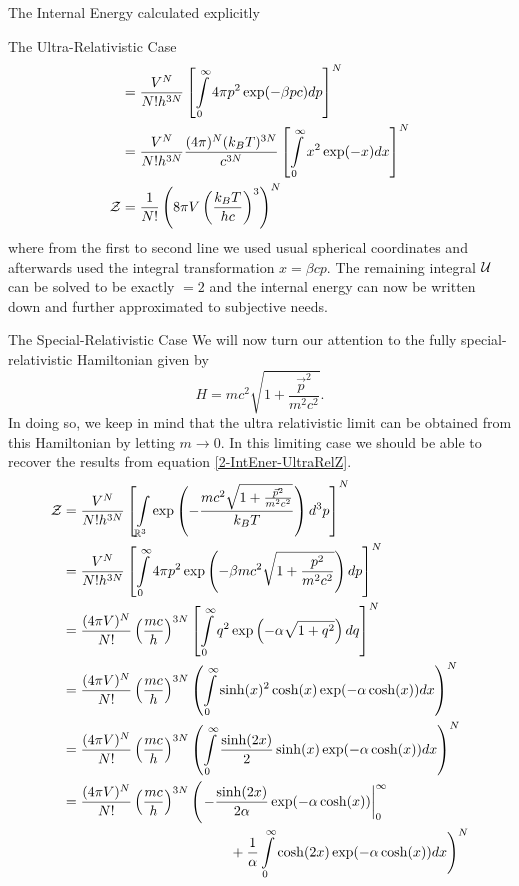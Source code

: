 \begin{section}{The Internal Energy calculated explicitly}
\begin{subsection}{The Ultra-Relativistic Case}
\begin{align}
		&= \frac{V^N}{N!h^{3N}}\left[\int\limits_0^\infty4\pi p^2\exp(-\beta pc) dp\right]^N\\
		&= \frac{V^N}{N!h^{3N}}\frac{(4\pi)^N(k_BT)^{3N}}{c^{3N}}\left[\int\limits_0^\infty x^2\exp(-x) dx\right]^N\\
	\mathcal{Z}	&= \frac{1}{N!}\left(8\pi V\left(\frac{k_BT}{hc}\right)^3\right)^N
	\label{2-IntEner-UltraRelZ}
\end{align}
where from the first to second line we used usual spherical coordinates and afterwards used the integral transformation $x=\beta cp$. The remaining integral $\mathcal{U}$ can be solved to be exactly $=2$ and the internal energy can now be written down and further approximated to subjective needs.
\end{subsection}
%
%
%
\begin{subsection}{The Special-Relativistic Case}
We will now turn our attention to the fully special-relativistic Hamiltonian given by
\begin{equation}
	H=mc^2\sqrt{1+\frac{\vec{p}^2}{m^2c^2}}.
\end{equation}
In doing so, we keep in mind that the ultra relativistic limit can be obtained from this Hamiltonian by letting $m\rightarrow0$. In this limiting case we should be able to recover the results from equation \eqref{2-IntEner-UltraRelZ}.
\begin{align}
	\Z 	&= \frac{V^N}{N!h^{3N}}\left[\int\limits_{\R^3}\exp\left(- \frac{mc^2\sqrt{1+\frac{\vec{p}^2}{m^2c^2}}}{k_BT}\right)d^3p\right]^N\label{2-IntEner-EQ1}\\
		&= \frac{V^N}{N!h^{3N}}\left[\int\limits_0^\infty 4\pi p^2\exp\left(-\beta mc^2\sqrt{1+\frac{p^2}{m^2c^2}} \right)dp\right]^N\\
		&= \frac{(4\pi V)^N}{N!}\left(\frac{mc}{h}\right)^{3N}\left[\int\limits_0^\infty q^2\exp\left(-\alpha\sqrt{1+q^2}\right)dq\right]^N\\
		&= \frac{(4\pi V)^N}{N!}\left(\frac{mc}{h}\right)^{3N}\left(\int\limits_0^\infty\sinh(x)^2\cosh(x)\exp(-\alpha\cosh(x))dx \right)^N\\
		&= \frac{(4\pi V)^N}{N!}\left(\frac{mc}{h}\right)^{3N}\left(\int\limits_0^\infty\frac{\sinh(2x)}{2}\sinh(x)\exp(-\alpha\cosh(x))dx \right)^N\\
		&= \frac{(4\pi V)^N}{N!}\left(\frac{mc}{h}\right)^{3N}\Biggl(\left.-\frac{\sinh(2x)}{2\alpha}\exp(-\alpha\cosh(x))\right|_0^\infty\\
		&\hspace{12em} + \frac{1}{\alpha}\int\limits_0^\infty\cosh(2x)\exp(-\alpha\cosh(x))dx  \Biggr)^N\\

\end{align}
\end{subsection}
\end{section}
